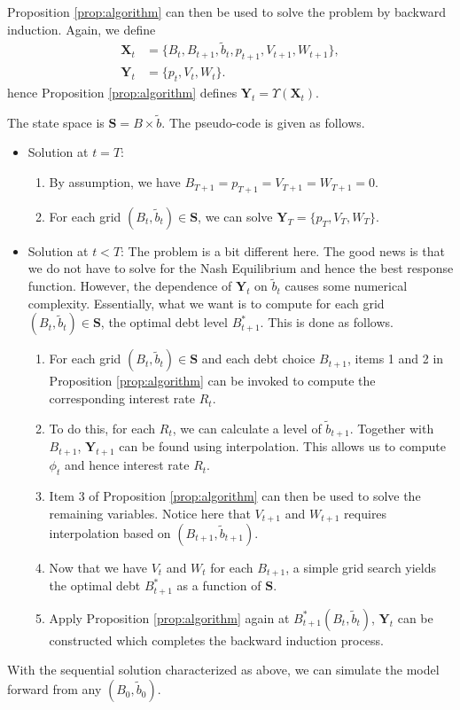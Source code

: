 \documentclass[twoside,11pt,leqno]{article}
\renewcommand{\vec}[1]{\ensuremath{\mathbf{#1}}}
\begin{document}
Proposition \ref{prop:algorithm} can then be used to solve the problem by backward induction. Again, we define
\begin{align*}
    \vec{X}_t &= \{B_t, B_{t+1}, \tilde{b}_t, p_{t+1}, V_{t+1}, W_{t+1} \}, \\
    \vec{Y}_t &= \{ p_t, V_t, W_t \}.
\end{align*}
hence Proposition \ref{prop:algorithm} defines $\vec{Y}_t = \Upsilon(\vec{X}_t)$.

The state space is $\vec{S} = B \times \tilde{b}$. The pseudo-code is given as follows.
\begin{itemize}
    \item
    Solution at $t = T$:
    \begin{enumerate}
        \item
        By assumption, we have $B_{T+1} = p_{T+1} = V_{T+1} = W_{T+1} = 0$.
        \item
        For each grid $(B_t, \tilde{b}_t) \in \vec{S}$, we can solve $\vec{Y}_T = \{p_T, V_T, W_T \}$.
    \end{enumerate}
    \item
    Solution at $t < T$: The problem is a bit different here. The good news is that we do not have to solve for the Nash Equilibrium and hence the best response function. However, the dependence of $\vec{Y}_t$ on $\tilde{b}_t$ causes some numerical complexity. Essentially, what we want is to compute for each grid $(B_t, \tilde{b}_t) \in \vec{S}$, the optimal debt level $B^*_{t+1}$. This is done as follows.
    \begin{enumerate}
        \item
        For each grid $(B_t, \tilde{b}_t) \in \vec{S}$ and each debt choice $B_{t+1}$, items 1 and 2 in Proposition \ref{prop:algorithm} can be invoked to compute the corresponding interest rate $R_t$.
        \item
        To do this, for each $R_t$, we can calculate a level of $\tilde{b}_{t+1}$. Together with $B_{t+1}$, $\vec{Y}_{t+1}$ can be found using interpolation. This allows us to compute $\phi_t$ and hence interest rate $R_t$.
        \item
        Item 3 of Proposition \ref{prop:algorithm} can then be used to solve the remaining variables. Notice here that $V_{t+1}$ and $W_{t+1}$ requires interpolation based on $(B_{t+1}, \tilde{b}_{t+1})$.
        \item
        Now that we have $V_t$ and $W_t$ for each $B_{t+1}$, a simple grid search yields the optimal debt $B^*_{t+1}$ as a function of $\vec{S}$.
        \item
        Apply Proposition \ref{prop:algorithm} again at $B^*_{t+1}(B_t, \tilde{b}_t)$, $\vec{Y}_t$ can be constructed which completes the backward induction process.
    \end{enumerate}
\end{itemize}

With the sequential solution characterized as above, we can simulate the model forward from any $(B_0, \tilde{b}_0)$.



\end{document}
